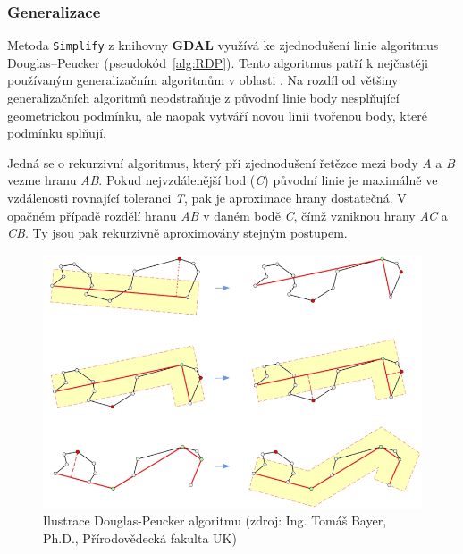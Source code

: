\subsubsection{Generalizace}
	Metoda \texttt{Simplify} z knihovny \textbf{GDAL} využívá ke zjednodušení linie algoritmus Douglas–Peucker (pseudokód~\ref{alg:RDP}). Tento algoritmus patří k nejčastěji používaným generalizačním algoritmům v oblasti . Na rozdíl od většiny generalizačních algoritmů neodstraňuje z původní linie body nesplňující geometrickou podmínku, ale naopak vytváří novou linii tvořenou body, které podmínku splňují. 
	
	Jedná se o rekurzivní algoritmus, který při zjednodušení řetězce mezi body \textit{A} a \textit{B} vezme hranu \textit{AB}. Pokud nejvzdálenější bod (\textit{C}) původní linie je maximálně ve vzdálenosti rovnající toleranci \textit{T}, pak je aproximace hrany dostatečná. V opačném případě rozdělí hranu \textit{AB} v daném bodě \textit{C}, čímž vzniknou hrany \textit{AC} a \textit{CB}. Ty jsou pak rekurzivně aproximovány stejným postupem. \cite{hershberger1992speeding}
	

\begin{figure}[H]
    \centering
      \includegraphics[width=350pt]{./pictures/DPalgoritmus.jpg}
      \caption[Ilustrace DP]{Ilustrace Douglas-Peucker algoritmu (zdroj: Ing. Tomáš Bayer, Ph.D., Přírodovědecká fakulta UK)}
      \label{fig:DPalgo}
\end{figure}
	
